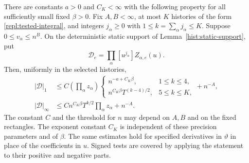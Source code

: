 \begin{lemma}\label{repl:history-derivatives}
There are constants $a>0$ and $C_K<\infty$ with the following property for
all sufficiently small fixed $\beta>0$.  Fix $A,B<\infty$, at most $K$
histories of the form \eqref{repl:tested-integral}, and integers
$j_\alpha\ge0$ with $1\le k=\sum_\alpha j_\alpha\le K$.  Suppose
$0\le v_\alpha\le n^B$.  On the deterministic static support of
Lemma~\ref{hist:static-support}, put
\[
 \mathscr D_e=\prod_\alpha [u^{j_\alpha}]Z_{\alpha,e}(u).
\]
Then, uniformly in the selected histories,
\begin{align}
 |\mathscr D|_1
 &\le C\left(\prod_\alpha z_\alpha\right)
 \begin{cases}
 n^{-a+C_K\beta},&1\le k\le4,\\
 n^{C_K\beta}T^{(k-4)/2},&5\le k\le K,
 \end{cases}
 +n^{-A},                                                     \label{repl:averaged-history}\\
 |\mathscr D|_\infty
 &\le C n^{C_K\beta}T^{k/2}\prod_\alpha z_\alpha+n^{-A}.
                                                               \label{repl:sup-history}
\end{align}
The constant $C$ and the threshold for $n$ may depend on $A,B$ and on the
fixed rectangles.  The exponent constant $C_K$ is independent of these
precision parameters and of $\beta$.  The same estimates hold for specified
derivatives in $\vartheta$ in place of the coefficients in $u$.  Signed tests
are covered by applying the statement to their positive and negative parts.
\end{lemma}

